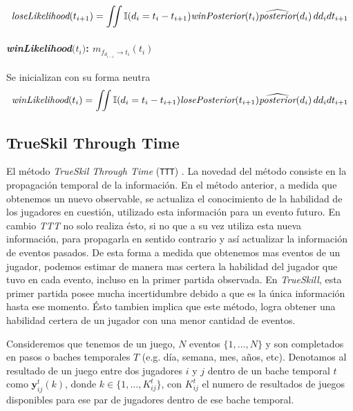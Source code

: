 \documentclass[11pt,twoside, spanish]{report} %
\newcommand{\vm}[1]{\mathbf{#1}}
\begin{document}
\begin{equation}
\begin{split}
\emph{loseLikelihood}(t_{i+1}) = \iint \mathbb{I}(d_{i} = t_i - t_{i+1} ) \emph{winPosterior}(t_i) \widehat{\emph{posterior}}(d_i) \, dd_idt_{i+1}
\end{split}
\end{equation}


\paragraph{\emph{winLikelihood}$\bm(t_{i})$: $m_{f_{d_{i-1}} \rightarrow t_{i}}(t_{i})$}
Se inicializan con su forma neutra
\begin{equation}
\begin{split}
\emph{winLikelihood}(t_{i}) = \iint \mathbb{I}(d_{i} = t_i - t_{i+1} ) \emph{losePosterior}(t_{i+1}) \widehat{\emph{posterior}}(d_i) \, dd_idt_{i+1}
\end{split}
\end{equation}





\subsection{TrueSkil Through Time}

El m\'etodo \textit{TrueSkil Through Time} (\texttt{TTT}) \cite{Dangauthier2007}.
La novedad del m\'etodo consiste en la propagaci\'on temporal de la informaci\'on.
En el m\'etodo anterior, a medida que obtenemos un nuevo observable, se actualiza el conocimiento de la habilidad de los jugadores en cuesti\'on, utilizado esta informaci\'on para un evento futuro.
En cambio \textit{TTT} no solo realiza \'esto, si no que a su vez utiliza esta nueva informaci\'on, para propagarla en sentido contrario y as\'i actualizar la informaci\'on de eventos pasados.
De esta forma a medida que obtenemos mas eventos de un jugador, podemos estimar de manera mas certera la habilidad del jugador  que tuvo en cada evento, incluso en la primer partida observada.
En \textit{TrueSkill}, esta primer partida posee mucha incertidumbre debido a que es la \'unica informaci\'on hasta ese momento.
\'Esto tambien implica que este m\'etodo, logra  obtener una habilidad certera de un jugador con una menor cantidad de eventos.

Consideremos que tenemos de un juego, $N$ eventos $\{1, \dots, N\}$ y son completados en pasos o baches temporales $T$ (e.g. d\'ia, semana, mes, a\~nos, etc).
Denotamos al resultado de un juego entre dos jugadores $i$ y $j$ dentro de un bache temporal $t$ como $\vm{y}^t_{ij}(k)$, donde $k \in \{1,\dots,K^t_{ij}\}$, con $K^t_{ij}$ el numero de resultados de juegos disponibles para ese par de jugadores dentro de ese bache temporal.
\end{document}

